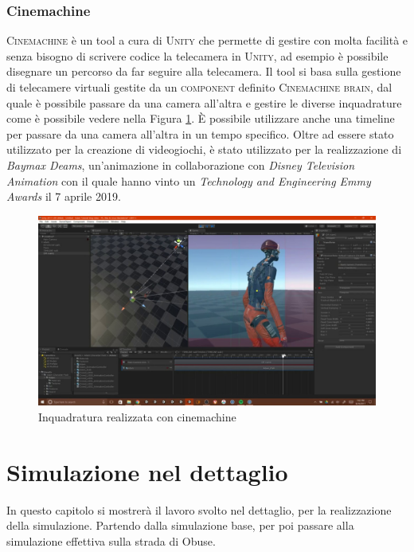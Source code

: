 \documentclass[12pt, openany]{book}
\begin{document}
	\subsection{Cinemachine}
	\textsc{Cinemachine} \cite{Cinemachine} è un tool a cura di \textsc{Unity} che permette di gestire con molta facilità e senza bisogno di scrivere codice la telecamera in \textsc{Unity}, ad esempio è possibile disegnare un percorso da far seguire alla telecamera. Il tool si basa sulla gestione di telecamere virtuali gestite da un \textsc{component} definito \textsc{Cinemachine brain}, dal quale è possibile passare da una camera all'altra e gestire le diverse inquadrature come è possibile vedere nella Figura \ref{fig:CinemachineLogo}. È possibile utilizzare anche una timeline per passare da una camera all'altra in un tempo specifico. Oltre ad essere stato utilizzato per la creazione di videogiochi, è stato utilizzato per la realizzazione di \emph{Baymax Deams}, un'animazione in collaborazione con \emph{Disney Television Animation} con il quale hanno vinto un \emph{ Technology and Engineering Emmy Awards} il 7 aprile 2019.
		\begin{figure}[H]
		\centering
		\includegraphics[width=1\linewidth]{"Immagini/CinemachineLogo.jpg"}
		\caption{Inquadratura realizzata con cinemachine}
		\label{fig:CinemachineLogo}
	\end{figure}
	
	
	\chapter{Simulazione nel dettaglio}
	In questo capitolo si mostrerà il lavoro svolto nel dettaglio, per la realizzazione della simulazione. Partendo dalla simulazione base, per poi passare alla simulazione effettiva sulla strada di Obuse. 
\end{document}
